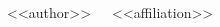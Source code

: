 \documentclass[letterpaper,12pt]{article}
\begin{document}
~~~\textmd{\small{<<author>>}}~~~\footnotesize{<<affiliation>>}
\vspace{-14pt}
\begin{multicols}{2}
\small


\footnotesize
\printbibliography

\end{multicols}
\end{document}
